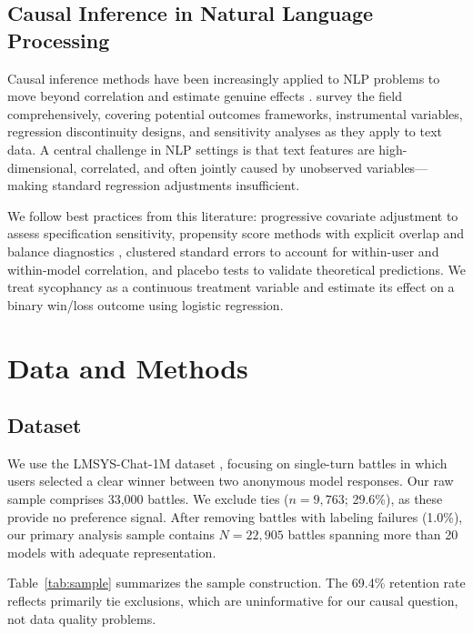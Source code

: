 \documentclass[11pt,twocolumn,a4paper]{article}
\begin{document}
\subsection{Causal Inference in Natural Language Processing}

Causal inference methods have been increasingly applied to NLP
problems to move beyond correlation and estimate genuine effects
\citep{feder2022causal}. \citet{feder2022causal} survey the field
comprehensively, covering potential outcomes frameworks, instrumental
variables, regression discontinuity designs, and sensitivity analyses
as they apply to text data. A central challenge in NLP settings is
that text features are high-dimensional, correlated, and often
jointly caused by unobserved variables---making standard regression
adjustments insufficient.

We follow best practices from this literature: progressive covariate
adjustment to assess specification sensitivity, propensity score
methods with explicit overlap and balance diagnostics
\citep{rosenbaum1983central}, clustered standard errors to account
for within-user and within-model correlation, and placebo tests to
validate theoretical predictions. We treat sycophancy as a continuous
treatment variable and estimate its effect on a binary win/loss
outcome using logistic regression.


\section{Data and Methods}
\label{sec:methods}

\subsection{Dataset}

We use the LMSYS-Chat-1M dataset \citep{zheng2023judging}, focusing
on single-turn battles in which users selected a clear winner between
two anonymous model responses. Our raw sample comprises 33,000 battles.
We exclude ties ($n = 9{,}763$; 29.6\%), as these provide no
preference signal. After removing battles with labeling failures (1.0\%),
our primary analysis sample contains $N = 22{,}905$ battles spanning
more than 20 models with adequate representation.

Table~\ref{tab:sample} summarizes the sample construction. The
69.4\% retention rate reflects primarily tie exclusions, which are
uninformative for our causal question, not data quality problems.
\end{document}
